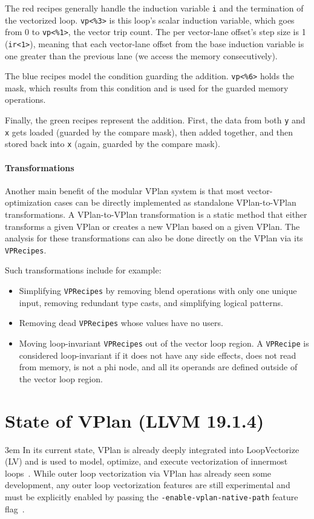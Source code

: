 \documentclass[sigplan,11pt,nonacm]{acmart}
\begin{document}
The red recipes generally handle the induction variable \texttt{i} and the termination of the 
vectorized loop. \texttt{vp<\%3>} is this loop's scalar induction variable, which goes from 0 to 
\texttt{vp<\%1>}, the vector trip count. The per vector-lane offset's step size is 1 (\texttt{ir<1>}), 
meaning that each 
vector-lane offset from the base induction variable is one greater than the previous lane (we access the 
memory consecutively).

The blue recipes model the condition guarding the addition. \texttt{vp<\%6>} holds the mask, which 
results from this condition and is used for the guarded memory operations.

Finally, the green recipes represent the addition. First, the data from both \texttt{y} and \texttt{x} 
gets loaded (guarded by the compare mask), then added together, and then stored back into 
\texttt{x} (again, guarded by the compare mask).

\paragraph{Transformations}
Another main benefit of the modular VPlan system is that most vector-optimization cases can 
be directly implemented as standalone VPlan-to-VPlan transformations. A VPlan-to-VPlan 
transformation is a static method that either transforms a given VPlan or creates a new 
VPlan based on a given VPlan. The analysis for these transformations can also be done 
directly on the VPlan via its \texttt{VPRecipes}.

Such transformations include for example:
\begin{itemize}
  \item Simplifying \texttt{VPRecipes} by removing blend operations with only one unique input, removing 
  redundant type casts, and simplifying logical patterns.
  \item Removing dead \texttt{VPRecipes} whose values have no users.
  \item Moving loop-invariant \texttt{VPRecipes} out of the vector loop region. A \texttt{VPRecipe} is 
  considered loop-invariant if it does not have any side effects, does not read from memory, is not a 
  phi node, and all its operands are defined outside of the vector loop region.
\end{itemize}

\section{State of VPlan (LLVM 19.1.4)}
\emergencystretch 3em
In its current state, VPlan is already deeply integrated into LoopVectorize (LV) and is
used to model, optimize, and execute vectorization of innermost loops~\cite{llvmvplan,llvmintrvplan,llvmvplanupdate}. 
While outer loop vectorization via VPlan has already seen some development, any 
outer loop vectorization features are still experimental and must be explicitly enabled 
by passing the \texttt{-enable-\allowbreak vplan-\allowbreak native-\allowbreak path} 
feature flag~\cite{llvmouterloop,llvmouterloopstatus}.
\end{document}
